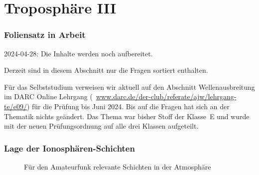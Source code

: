 
\section{Troposphäre III}
\label{section:troposphaere_3}
\begin{frame}%

\frametitle{Foliensatz in Arbeit}
2024-04-28: Die Inhalte werden noch aufbereitet.

Derzeit sind in diesem Abschnitt nur die Fragen sortiert enthalten.

Für das Selbststudium verweisen wir aktuell auf den Abschnitt Wellenausbreitung im DARC Online Lehrgang (\textcolor{DARCblue}{\faLink~\href{https://www.darc.de/der-club/referate/ajw/lehrgang-te/e09/}{www.darc.de/der-club/referate/ajw/lehrgang-te/e09/}}) für die Prüfung bis Juni 2024. Bis auf die Fragen hat sich an der Thematik nichts geändert. Das Thema war bisher Stoff der Klasse~E und wurde mit der neuen Prüfungsordnung auf alle drei Klassen aufgeteilt.

\end{frame}

\begin{frame}
\frametitle{Lage der Ionosphären-Schichten}

\begin{figure}
    \caption{\scriptsize Für den Amateurfunk relevante Schichten in der Atmosphäre}
    \label{e_atmosphaeren_schichten}
\end{figure}

\end{frame}

\begin{frame}
\end{frame}

